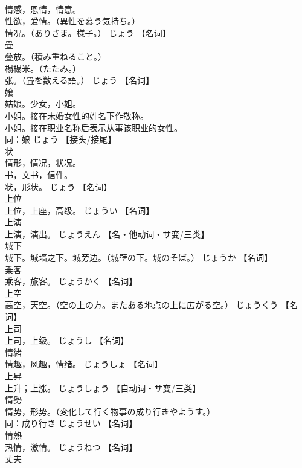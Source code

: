 \documentclass[8pt]{extreport}
\begin{document}
\begin{CJK}{UTF8}{min}
\\	情感，恩情，情意。 
\\	性欲，爱情。（異性を慕う気持ち。） 
\\	情况。（ありさま。様子。）	じょう		【名词】
\\	畳	
\\	叠放。（積み重ねること。） 
\\	榻榻米。（たたみ。） 
\\	张。（畳を数える語。）	じょう		【名词】
\\	嬢	
\\	姑娘。少女，小姐。 
\\	小姐。接在未婚女性的姓名下作敬称。 
\\	小姐。接在职业名称后表示从事该职业的女性。 
\\	同：娘	じょう		【接头/接尾】
\\	状	
\\	情形，情况，状况。 
\\	书，文书，信件。 
\\	状，形状。	じょう		【名词】
\\	上位	
\\	上位，上座，高级。	じょうい		【名词】
\\	上演	
\\	上演，演出。	じょうえん		【名・他动词・サ变/三类】
\\	城下	
\\	城下。城墙之下。城旁边。（城壁の下。城のそば。）	じょうか		【名词】
\\	乗客	
\\	乘客，旅客。	じょうかく		【名词】
\\	上空	
\\	高空，天空。（空の上の方。またある地点の上に広がる空。）	じょうくう		【名词】
\\	上司	
\\	上司，上级。	じょうし		【名词】
\\	情緒	
\\	情趣，风趣，情绪。	じょうしょ		【名词】
\\	上昇	
\\	上升；上涨。	じょうしょう		【自动词・サ变/三类】
\\	情勢	
\\	情势，形势。（変化して行く物事の成り行きやようす。） 
\\	同：成り行き	じょうせい		【名词】
\\	情熱	
\\	热情，激情。	じょうねつ		【名词】
\\	丈夫	

\end{CJK}
\end{document}
